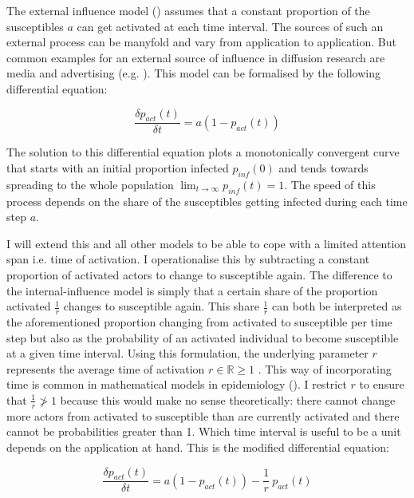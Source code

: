 \documentclass[a4paper,12pt]{article}
\begin{document}
The external influence model (\cite{mahajanModelsInnovationDiffusion1985}) assumes that a constant proportion of the susceptibles $a$ can get activated at each time interval. The sources of such an external process can be manyfold and vary from application to application. But common examples for an external source of influence in diffusion research are media and advertising (e.g. \cite{mahajanModelsInnovationDiffusion1985, rossmanDiffusionLegitimateDiffusion2014}). This model can be formalised by the following differential equation:
    
\begin{equation}
\frac{\delta p_{act}(t)}{\delta t} = a (1 - p_{act}(t))
\end{equation}

The solution to this differential equation plots a monotonically convergent curve that starts with an initial proportion infected $p_{inf}(0)$ and tends towards spreading to the whole population $\lim_{t \to \infty} p_{inf}(t) = 1$. The speed of this process depends on the share of the susceptibles getting infected during each time step $a$.

I will extend this and all other models to be able to cope with a limited attention span i.e. time of activation. I operationalise this by subtracting a constant proportion of activated actors to change to susceptible again. The difference to the internal-influence model is simply that a certain share of the proportion activated $\frac{1}{r}$ changes to susceptible again. This share $\frac{1}{r}$ can both be interpreted as the aforementioned proportion changing from activated to susceptible per time step but also as the probability of an activated individual to become susceptible at a given time interval. Using this formulation, the underlying parameter $r$ represents the average time of activation $r \in \mathbb{R} \geqslant 1$ . This way of incorporating time is common in mathematical models in epidemiology (\cite[123]{hethcoteThreeBasicEpidemiological1989}). I restrict $r$ to ensure that $\frac{1}{r} \ngtr 1$ because this would make no sense theoretically: there cannot change more actors from activated to susceptible than are currently activated and there cannot be probabilities greater than 1. Which time interval is useful to be a unit depends on the application at hand. This is the modified differential equation:
    
\begin{equation}
\frac{\delta p_{act}(t)}{\delta t} = a (1 - p_{act}(t)) - \frac{1}{r} \ p_{act}(t)
\end{equation}
\end{document}
